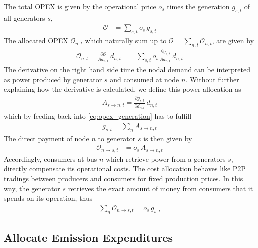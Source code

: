\documentclass[11pt,twocolumn]{article}
\newcommand{\pdv}[2]{\frac{\partial #1}{\partial #2}}
\newcommand{\generation}{g_{s,t}}
\newcommand{\opexGeneration}{o_{s}}
\newcommand{\demand}[1][n]{d_{#1,t}}
\newcommand{\allocatePeer}[1][s \rightarrow n]{A_{#1,t}}
\newcommand{\allocateOpex}[1][n]{\mathcal{O}_{#1,t}}
\newcommand{\totalOpexGeneration}{\mathcal{O}}
\begin{document}
The total OPEX is given by the operational price $\opexGeneration$ times the generation $\generation$ of all generators $s$, 
\begin{align}
 \totalOpexGeneration& = \sum_{s,t} \opexGeneration\,  \generation 
\label{eq:opex_generation}
 \end{align}
The allocated OPEX $\allocateOpex$ which naturally sum up to $  \totalOpexGeneration = \sum_{n,t} \allocateOpex$, are given by 
\begin{align}
\allocateOpex  = \pdv{\totalOpexGeneration}{\demand} \, \demand & =  \sum_{s,t}\opexGeneration \, \pdv{\generation}{\demand} \, \demand
\end{align}
% 
The derivative on the right hand side time the nodal demand can be interpreted as power produced by generator $s$ and consumed at node $n$. Without further explaining how the derivative is calculated, we define this power allocation as 
\begin{align}
 \allocatePeer = \pdv{\generation}{\demand} \, \demand
 \label{eq:allocate_peer}
\end{align}
% 
which by feeding back into \cref{eq:opex_generation} has to fulfill
\begin{align}
\generation = \sum_n \allocatePeer
\label{eq:allocate_peer_constraint}
\end{align}
% 
% 
The direct payment of node $n$ to generator $s$ is then given by  
% 
\begin{align}
 \allocateOpex[n \rightarrow s] &= 
\opexGeneration \,  \allocatePeer
\label{eq:allocate_opexGeneration_detailed}
\end{align}
Accordingly, consumers at bus $n$ which retrieve power from a generators $s$, directly  compensate its operational costs. The cost allocation behaves like P2P tradings between producers and consumers for fixed production prices. In this way, the generator $s$ retrieves the exact amount of money from consumers that it spends on its operation, thus 
\begin{align}
\sum_{n} \allocateOpex[n \rightarrow s] = \opexGeneration \, \generation
\label{eq:no_profit_opex}
\end{align}

\subsection{Allocate Emission Expenditures}
\end{document}
